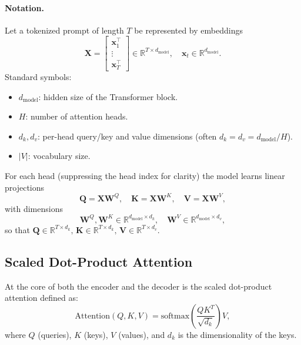 \documentclass[11pt]{article}
\theoremstyle{remark}
\begin{document}
\paragraph{Notation.}
Let a tokenized prompt of length \(T\) be represented by embeddings
\[
\mathbf{X} =
\begin{bmatrix}
\mathbf{x}_1^\top\\ \vdots\\ \mathbf{x}_T^\top
\end{bmatrix}\in\mathbb{R}^{T\times d_{\text{model}}},\quad \mathbf{x}_t\in\mathbb{R}^{d_{\text{model}}}.
\]
Standard symbols:
\begin{itemize}[noitemsep]
  \item \(d_{\text{model}}\): hidden size of the Transformer block.
  \item \(H\): number of attention heads.
  \item \(d_k,d_v\): per-head query/key and value dimensions (often \(d_k=d_v=d_{\text{model}}/H\)).
  \item \(|V|\): vocabulary size.
\end{itemize}

For each head (suppressing the head index for clarity) the model learns linear projections
\[
\mathbf{Q}=\mathbf{X}\mathbf{W}^Q,\quad \mathbf{K}=\mathbf{X}\mathbf{W}^K,\quad \mathbf{V}=\mathbf{X}\mathbf{W}^V,
\]
with dimensions
\[
\mathbf{W}^Q,\mathbf{W}^K\in\mathbb{R}^{d_{\text{model}}\times d_k},\quad \mathbf{W}^V\in\mathbb{R}^{d_{\text{model}}\times d_v},
\]
so that
\(
\mathbf{Q}\in\mathbb{R}^{T\times d_k},\,
\mathbf{K}\in\mathbb{R}^{T\times d_k},\,
\mathbf{V}\in\mathbb{R}^{T\times d_v}.
\)

\subsection{Scaled Dot-Product Attention}

At the core of both the encoder and the decoder is the scaled dot-product attention defined as:
\[
\text{Attention}(Q, K, V) = \text{softmax}\!\left(\frac{QK^T}{\sqrt{d_k}}\right) V,
\]
where \( Q \) (queries), \( K \) (keys), \( V \) (values), and \( d_k \) is the dimensionality of the keys.
\end{document}
